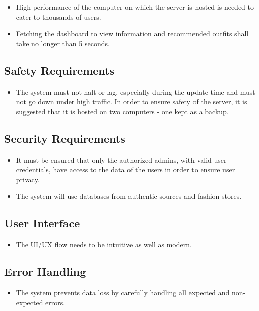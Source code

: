 \begin{itemize}
    \item High performance of the computer on which the server is hosted is needed to cater to thousands of users. 
    
    \item Fetching the dashboard to view information and recommended outfits shall take no longer than 5 seconds.
\end{itemize}

\subsection{Safety Requirements}
\begin{itemize}
    \item The system must not halt or lag, especially during the update time and must not go down under high traffic. In order to ensure safety of the server, it is suggested that it is hosted on two computers - one kept as a backup.
\end{itemize}

\subsection{Security Requirements}
\begin{itemize}
    \item It must be ensured that only the authorized admins, with valid user credentials, have access to the data of the users in order to ensure user privacy. 
    
    \item The system will use databases from authentic sources and fashion stores.
\end{itemize}

\subsection{User Interface}
\begin{itemize}
    \item The UI/UX flow needs to be intuitive as well as modern. 
\end{itemize}

\subsection{Error Handling}
\begin{itemize}
    \item The system prevents data loss by carefully handling all expected and non-expected errors. 
\end{itemize}

